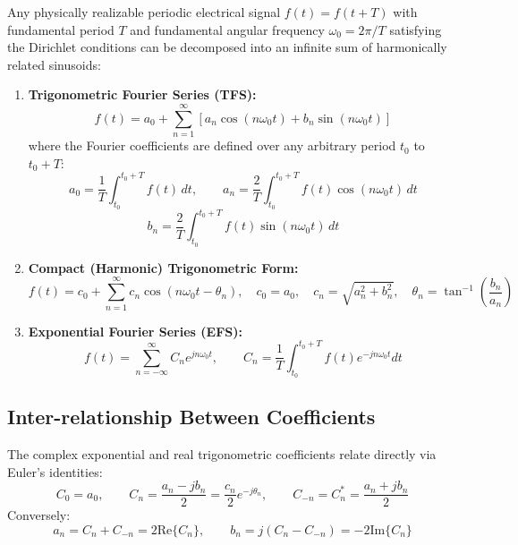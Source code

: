 \documentclass[12pt,a4paper]{article}
\begin{document}
\begin{tcolorbox}[defbox, title={\textbf{Definition: Trigonometric and Exponential Fourier Series}}]
Any physically realizable periodic electrical signal $f(t) = f(t + T)$ with fundamental period $T$ and fundamental angular frequency $\omega_0 = 2\pi/T$ satisfying the Dirichlet conditions can be decomposed into an infinite sum of harmonically related sinusoids:
\begin{enumerate}[leftmargin=*, itemsep=2pt, topsep=1pt]
  \item \textbf{Trigonometric Fourier Series (TFS):}
  \begin{equation}
    f(t) = a_0 + \sum_{n=1}^\infty \left[ a_n \cos(n\omega_0 t) + b_n \sin(n\omega_0 t) \right]
  \end{equation}
  where the Fourier coefficients are defined over any arbitrary period $t_0$ to $t_0 + T$:
  \begin{equation}
    a_0 = \frac{1}{T} \int_{t_0}^{t_0+T} f(t)\,dt, \qquad a_n = \frac{2}{T} \int_{t_0}^{t_0+T} f(t) \cos(n\omega_0 t)\,dt
  \end{equation}
  \begin{equation}
    b_n = \frac{2}{T} \int_{t_0}^{t_0+T} f(t) \sin(n\omega_0 t)\,dt
  \end{equation}
  \item \textbf{Compact (Harmonic) Trigonometric Form:}
  \begin{equation}
    f(t) = c_0 + \sum_{n=1}^\infty c_n \cos(n\omega_0 t - \theta_n), \quad c_0 = a_0, \quad c_n = \sqrt{a_n^2 + b_n^2}, \quad \theta_n = \tan^{-1}\left(\frac{b_n}{a_n}\right)
  \end{equation}
  \item \textbf{Exponential Fourier Series (EFS):}
  \begin{equation}
    f(t) = \sum_{n=-\infty}^\infty C_n e^{j n \omega_0 t}, \qquad C_n = \frac{1}{T} \int_{t_0}^{t_0+T} f(t) e^{-j n \omega_0 t} dt
  \end{equation}
\end{enumerate}
\end{tcolorbox}

\subsection{Inter-relationship Between Coefficients}
The complex exponential and real trigonometric coefficients relate directly via Euler's identities:
\begin{equation}
  C_0 = a_0, \qquad C_n = \frac{a_n - jb_n}{2} = \frac{c_n}{2} e^{-j\theta_n}, \qquad C_{-n} = C_n^* = \frac{a_n + jb_n}{2}
\end{equation}
Conversely:
\begin{equation}
  a_n = C_n + C_{-n} = 2 \text{Re}\{C_n\}, \qquad b_n = j(C_n - C_{-n}) = -2 \text{Im}\{C_n\}
\end{equation}
\end{document}
